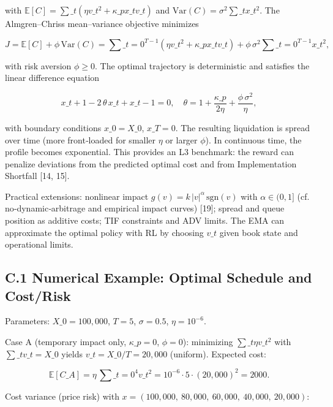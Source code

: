 \documentclass[11pt,a4paper]{article}
\begin{document}
with $\mathbb{E}[C] = \sum\_t (\eta v\_t^2 + \kappa\_p x\_t v\_t)$ and $\mathrm{Var}(C)=\sigma^2\sum\_t x\_t^2$. The Almgren–Chriss mean–variance objective minimizes

\begin{equation}
J = \mathbb{E}[C] + \phi\,\mathrm{Var}(C) = \sum\_{t=0}^{T-1} (\eta v\_t^2 + \kappa\_p x\_t v\_t) + \phi\,\sigma^2\sum\_{t=0}^{T-1} x\_t^2,
\end{equation}

with risk aversion $\phi\ge 0$. The optimal trajectory is deterministic and satisfies the linear difference equation

\begin{equation}
x\_{t+1} - 2\,\theta\,x\_t + x\_{t-1} = 0,\quad \theta = 1 + \frac{\kappa\_p}{2\eta} + \frac{\phi\,\sigma^2}{\eta},
\end{equation}

with boundary conditions $x\_0=X\_0$, $x\_T=0$. The resulting liquidation is spread over time (more front‑loaded for smaller $\eta$ or larger $\phi$). In continuous time, the profile becomes exponential. This provides an L3 benchmark: the reward can penalize deviations from the predicted optimal cost and from Implementation Shortfall [14, 15].

Practical extensions: nonlinear impact $g(v)=k\,|v|^\alpha\,\mathrm{sgn}(v)$ with $\alpha\in(0,1]$ (cf. no‑dynamic‑arbitrage and empirical impact curves) [19]; spread and queue position as additive costs; TIF constraints and ADV limits. The EMA can approximate the optimal policy with RL by choosing $v\_t$ given book state and operational limits.

\subsection{C.1 Numerical Example: Optimal Schedule and Cost/Risk}

Parameters: $X\_0=100,000$, $T=5$, $\sigma=0.5$, $\eta=10^{-6}$.

Case A (temporary impact only, $\kappa\_p=0$, $\phi=0$): minimizing $\sum\_t \eta v\_t^2$ with $\sum\_t v\_t=X\_0$ yields $v\_t=X\_0/T=20,000$ (uniform). Expected cost:

\begin{equation}
\mathbb{E}[C\_A] = \eta\,\sum\_{t=0}^{4} v\_t^2 = 10^{-6}\cdot 5 \cdot (20,000)^2 = 2000.
\end{equation}

Cost variance (price risk) with $x=(100,000,\ 80,000,\ 60,000,\ 40,000,\ 20,000)$:
\end{document}

